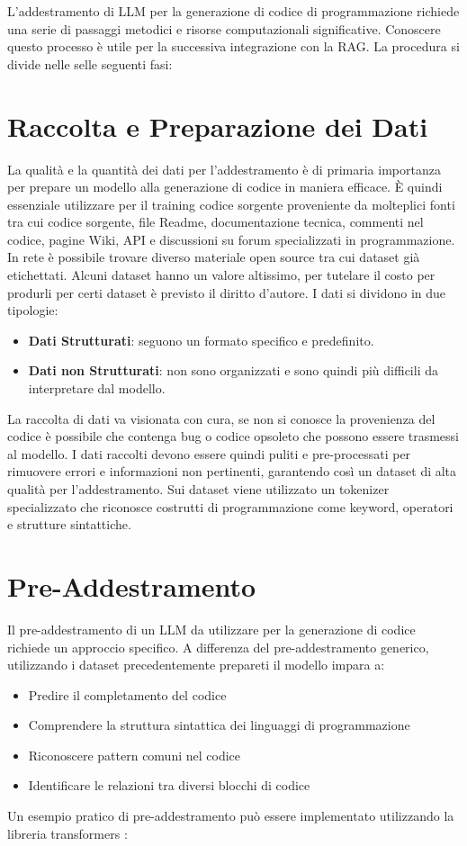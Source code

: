 \documentclass[12pt,a4paper,openright,twoside]{book}
\begin{document}
L'addestramento di LLM per la generazione di codice di programmazione richiede una serie di passaggi metodici e risorse computazionali significative.
Conoscere questo processo è utile per la successiva integrazione con la RAG.
La procedura si divide nelle selle seguenti fasi:

\section{Raccolta e Preparazione dei Dati}

La qualità e la quantità dei dati per l'addestramento è di primaria importanza per prepare un modello alla generazione di codice in maniera efficace.
È quindi essenziale utilizzare per il training codice sorgente proveniente da molteplici fonti tra cui codice sorgente, file Readme, documentazione tecnica, commenti nel codice,
pagine Wiki, API e discussioni su forum specializzati in programmazione.
In rete è possibile trovare diverso materiale open source tra cui dataset già etichettati. Alcuni dataset hanno un valore altissimo, per tutelare il costo per produrli per certi dataset è previsto il diritto d'autore.
I dati si dividono in due tipologie:
\begin{itemize}
    \item \textbf{Dati Strutturati}: seguono un formato specifico e predefinito.
    \item \textbf{Dati non Strutturati}: non sono organizzati e sono quindi più difficili da interpretare dal modello. 
\end{itemize}
La raccolta di dati va visionata con cura, se non si conosce la provenienza del codice è possibile che contenga bug o codice opsoleto che possono essere trasmessi al modello.
I dati raccolti devono essere quindi puliti e pre-processati per rimuovere errori e informazioni non pertinenti, garantendo così un dataset di alta qualità per l'addestramento.
Sui dataset viene utilizzato un tokenizer specializzato che riconosce costrutti di programmazione come keyword, operatori e strutture sintattiche.

\section{Pre-Addestramento}
Il pre-addestramento di un LLM  da utilizzare per la generazione di codice richiede un approccio specifico.
A differenza del pre-addestramento generico, utilizzando i dataset precedentemente prepareti il modello impara a:
\begin{itemize}
    \item Predire il completamento del codice
    \item Comprendere la struttura sintattica dei linguaggi di programmazione
    \item Riconoscere pattern comuni nel codice
    \item Identificare le relazioni tra diversi blocchi di codice
\end{itemize}
Un esempio pratico di pre-addestramento può essere implementato utilizzando la libreria transformers \cite{huggingface-transformers, codebert}:
\end{document}
